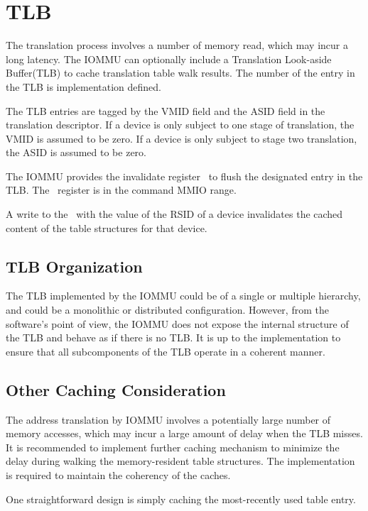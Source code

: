 \section{TLB}
\label{sec:tlb}

The translation process involves a number of memory read, which may incur a long latency.
The IOMMU can optionally include a Translation Look-aside Buffer(TLB) to cache
translation table walk results. The number of the entry in the TLB is implementation
defined.

The TLB entries are tagged by the VMID field and the ASID field in the translation
descriptor. If a device is only subject to one stage of translation, the VMID is assumed
to be zero. If a device is only subject to stage two translation, the ASID is assumed to
be zero.

The IOMMU provides the invalidate register \invltlb\ to flush the designated entry in
the TLB. The \invltlb\ register is in the command MMIO range.

A write to the \invltlb\ with the value of the RSID of a device invalidates the cached
content of the table structures for that device.



\subsection{TLB Organization}

The TLB implemented by the IOMMU could be of a single or multiple hierarchy, and could be
a monolithic or distributed configuration. However, from the software's point of view, the
IOMMU does not expose the internal structure of the TLB and behave as if there is no TLB.
It is up to the implementation to ensure that all subcomponents of the TLB operate in a
coherent manner.

\subsection{Other Caching Consideration}

The address translation by IOMMU involves a potentially large number of memory accesses,
which may incur a large amount of delay when the TLB misses. It is recommended to
implement further caching mechanism to minimize the delay during walking the
memory-resident table structures. The implementation is required to maintain the
coherency of the caches.

\note One straightforward design is simply caching the most-recently used table entry.
\noteend

